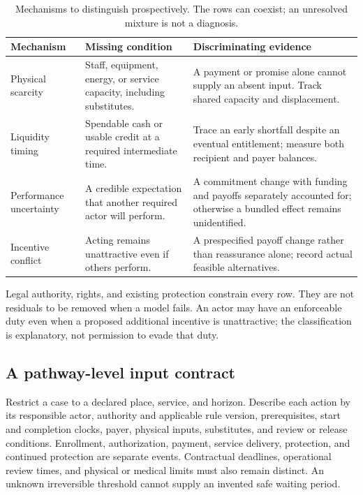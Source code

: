 \documentclass[11pt,a4paper]{article}
\numberwithin{equation}{section}
\theoremstyle{definition}
\theoremstyle{plain}
\theoremstyle{remark}
\begin{document}
\begin{table}[H]
\centering\small
\caption{Mechanisms to distinguish prospectively. The rows can coexist; an unresolved mixture is not a diagnosis.}
\label{tab:mechanisms}
\begin{tabularx}{\textwidth}{@{}L{0.20\textwidth}Y Y@{}}
\toprule
\textbf{Mechanism} & \textbf{Missing condition} & \textbf{Discriminating evidence} \\
\midrule
Physical scarcity & Staff, equipment, energy, or service capacity, including substitutes. & A payment or promise alone cannot supply an absent input. Track shared capacity and displacement. \\
Liquidity timing & Spendable cash or usable credit at a required intermediate time. & Trace an early shortfall despite an eventual entitlement; measure both recipient and payer balances. \\
Performance uncertainty & A credible expectation that another required actor will perform. & A commitment change with funding and payoffs separately accounted for; otherwise a bundled effect remains unidentified. \\
Incentive conflict & Acting remains unattractive even if others perform. & A prespecified payoff change rather than reassurance alone; record actual feasible alternatives. \\
\bottomrule
\end{tabularx}
\end{table}

Legal authority, rights, and existing protection constrain every row. They are not residuals to be removed when a model fails. An actor may have an enforceable duty even when a proposed additional incentive is unattractive; the classification is explanatory, not permission to evade that duty.

\subsection{A pathway-level input contract}

Restrict a case to a declared place, service, and horizon. Describe each action by its responsible actor, authority and applicable rule version, prerequisites, start and completion clocks, payer, physical inputs, substitutes, and review or release conditions. Enrollment, authorization, payment, service delivery, protection, and continued protection are separate events. Contractual deadlines, operational review times, and physical or medical limits must also remain distinct. An unknown irreversible threshold cannot supply an invented safe waiting period.
\end{document}
